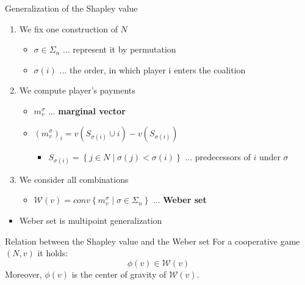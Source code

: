 \documentclass{beamer}
\begin{document}
\begin{frame}{Generalization of the Shapley value}
    \pause
    \begin{enumerate}
		\item We fix one construction of $N$
		\begin{itemize}
			\item $\sigma \in \Sigma_n$ ... represent it by permutation
			\item $\sigma(i)$ ... the order, in which player i enters the coalition
		\end{itemize}
        \pause
		\item We compute player's payments
		\begin{itemize}
			\item $m^\sigma_v$ ... \textbf{marginal vector}
			\item $\left(m^\sigma_v\right)_i=v\left(S_{\sigma(i)}\cup i\right)-v\left(S_{\sigma(i)}\right)$
			\begin{itemize}
				\item $S_{\sigma(i)}= \left\{j \in N \mid \sigma(j) < \sigma(i)\right\}$ ... predecessors of $i$ under $\sigma$
			\end{itemize}
		\end{itemize}
        \pause
		\item We consider all combinations
		\begin{itemize}
			\item $\mathcal{W}(v)=conv\left\{m^{\sigma}_{v}\mid \sigma \in \Sigma_n\right\}$ ... \textbf{Weber set}
		\end{itemize}
	\end{enumerate}
    \pause
	\begin{itemize}
		\item Weber set is multipoint generalization
	\end{itemize}
    \pause
	\begin{block}{Relation between the Shapley value and the Weber set}
        \pause
		For a cooperative game $(N,v)$ it holds:
		\[\phi(v) \in \mathcal{W}(v)\]
		Moreover, $\phi(v)$ is the center of gravity of $\mathcal{W}(v)$.
	\end{block}
\end{frame}


\end{document}
